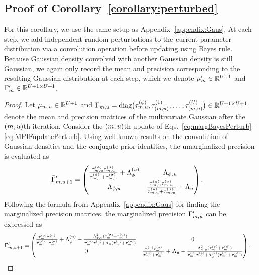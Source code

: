 \documentclass[12pt]{article}\usepackage[]{graphicx}\usepackage[]{xcolor}
\begin{document}
\begin{appendices}
  \subsection{Proof of Corollary~\ref{corollary:perturbed}}\label{appendix:perturbed}

  For this corollary, we use the same setup as Appendix~\ref{appendix:Gaus}.
  At each step, we add independent random perturbations to the current parameter distribution via a convolution operation before updating using Bayes rule.
  Because Gaussian density convolved with another Gaussian density is still Gaussian, we again only record the mean and precision corresponding to the resulting Gaussian distribution at each step, which we denote $\mu'_{m} \in \mathbb{R}^{U+1}$ and $\Gamma'_{m} \in \mathbb{R}^{U+1\times U+1}$.

\begin{proof}
Let $\mu_{m, u} \in \mathbb{R}^{U+1}$ and
$\Gamma_{m, u} = \text{diag}
  \big(
    \tau_{m, u}^{(\phi)}, \tau_{(m, u)}^{(1)}, \ldots, \tau_{(m, u)}^{(U)}
  \big)
  \in \mathbb{R}^{U+1\times U+1}$
denote the mean and precision matrices of the multivariate Gaussian after the $(m, u)$th iteration.
Consider the $(m, u)$th update of Eqs.~\ref{eq:margBayesPerturb}--\ref{eq:MPIFupdatePerturb}.
Using well-known results on the convolution of Gaussian densities and the conjugate prior identities, the umarginalized precision is evaluated as
\begin{align*}
\tilde{\Gamma}'_{m, u+1} &= \begin{pmatrix} \frac{\tau_{m, u}^{(\phi)}\tau_{m, u}^{(\sigma)}}{\tau_{m, u}^{(\phi)} + \tau_{m, u}^{(\sigma)}} + \Lambda^{(u)}_\phi & \Lambda_{\phi, u} \\ \Lambda_{\phi, u} & \frac{\tau_{m, u}^{(u)}\tau_{m, u}^{(\sigma)}}{\tau_{m, u}^{(u)} + \tau_{m, u}^{(\sigma)}} + \Lambda_u\end{pmatrix}.
   \end{align*}
   Following the formula from Appendix~\ref{appendix:Gaus} for finding the marginalized precision matrices, the marginalized precision $\Gamma'_{m, u}$ can be expressed as
     \begin{align*}
   \Gamma'_{\nmif, \unit+1} &= \begin{pmatrix} \frac{\tau^{(\phi)}_\nmif\tau^{(\sigma)}_\nmif}{\tau^{(\phi)}_\nmif + \tau^{(\sigma)}_\nmif} + \Lambda^{(\unit)}_{\phi} - \frac{\Lambda^2_{\phi, u}(\tau^{(\sigma)}_\nmif + \tau^{(u)}_\nmif)}{\tau^{(\sigma)}_\nmif\tau^{(\unit)}_\nmif + \Lambda_u(\tau^{(\sigma)}_\nmif + \tau^{(u)}_\nmif)} & 0 \\ 0 & \frac{\tau^{(u)}_\nmif\tau^{(\sigma)}_\nmif}{\tau^{(u)}_\nmif + \tau^{(\sigma)}_\nmif} + \Lambda_{u} - \frac{\Lambda^2_{\phi, u}(\tau^{(\sigma)}_\nmif + \tau^{(\phi)}_\nmif)}{\tau^{(\sigma)}_\nmif\tau^{(\phi)}_\nmif + \Lambda^{(u)}_\phi(\tau^{(\sigma)}_\nmif + \tau^{(\phi)}_\nmif)}\end{pmatrix}.

\end{align*}
\end{proof}
\end{appendices}
\end{document}
